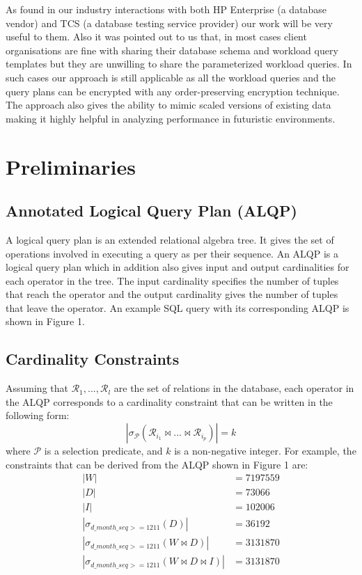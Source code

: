 \documentclass[]{article}
\begin{document}
\begin{multicols}{2}
		As found in our industry interactions with both HP Enterprise (a database vendor) and TCS (a database testing service provider) our work will be very useful to them. 
		Also it was pointed out to us that, in most cases client organisations are fine with sharing their database schema and workload query templates but they are unwilling to share the parameterized workload queries. 
		In such cases our approach is still applicable as all the workload queries and the query plans can be encrypted with any order-preserving encryption technique. 
		The approach also gives the ability to mimic scaled versions of existing data making it highly helpful in analyzing performance in futuristic environments.
		
	\section{Preliminaries}
	        \subsection{Annotated Logical Query Plan (ALQP)}
		A logical query plan is an extended relational algebra tree. 
		It gives the set of operations involved in executing a query as per their sequence. 
		An ALQP is a logical query plan which in addition also gives input and output cardinalities for each operator in the tree. 
		The input cardinality specifies the number of tuples that reach the operator and the output cardinality gives the number of tuples that leave the operator. 
		An example SQL query with its corresponding ALQP is shown in Figure 1. 
		
		\subsection{Cardinality Constraints}
		Assuming that $\mathcal{R}_1, ... , \mathcal{R}_l$ are the set of relations in the database, each operator in the ALQP corresponds to a cardinality constraint that can be written in the following form:
			\begin{equation}
				| \sigma_\mathcal{P} (\mathcal{R}_{i_1} \bowtie ... \bowtie \mathcal{R}_{i_p}) | = k
			\end{equation}
		where $\mathcal{P}$ is a selection predicate, and $k$ is a non-negative integer.
		For example, the constraints that can be derived from the ALQP shown in Figure 1 are:
			\begin{align}
				|W| & = 7197559 \nonumber \\
				|D| & = 73066 \nonumber \\
				|I| & = 102006 \nonumber \\
				|\sigma_{d\_month\_seq >= 1211}(D)| & = 36192 \nonumber \\
				|\sigma_{d\_month\_seq >= 1211}(W \bowtie D)| & = 3131870 \\
				|\sigma_{d\_month\_seq >= 1211}(W \bowtie D \bowtie I)| & = 3131870
			\end{align}


\end{multicols}
\end{document}
